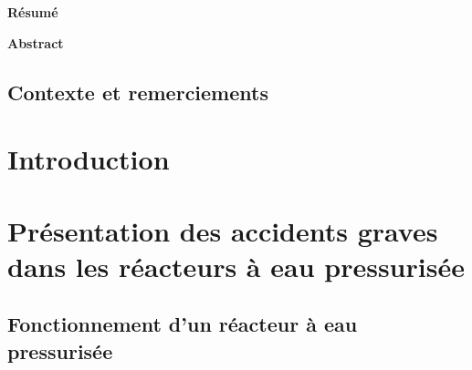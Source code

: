 \documentclass[a4paper,11pt,fleqn]{report}    %
\begin{document}



\thispagestyle{empty}
\begin{center}
    \Large


    \vspace{0.9cm}
    \textbf{Résumé}
\end{center}

\blindtext

\begin{center}
	\Large
	\vspace{0.9cm}
	\textbf{Abstract}
\end{center}

\blindtext



\newpage
\hypersetup{pageanchor=true}
\setcounter{page}{1}
\tableofcontents



\newpage
\printnomenclature



\newpage
\section*{Contexte et remerciements}
\chapter{Introduction}
\chapter{Présentation des accidents graves dans les réacteurs à eau pressurisée}
\section{Fonctionnement d'un réacteur à eau pressurisée}
\end{document}
